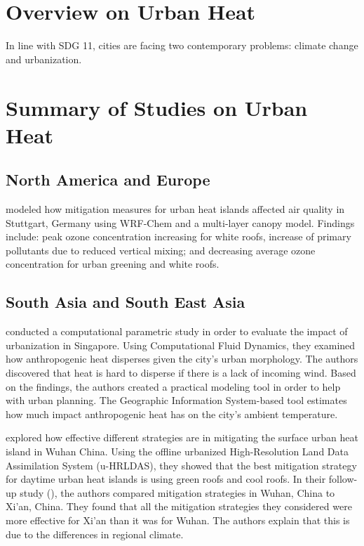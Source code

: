 \section{Overview on Urban Heat}
	
	In line with SDG 11, cities are facing two contemporary problems: climate change and urbanization.
	

\section{Summary of Studies on Urban Heat}	
	\subsection{North America and Europe}
		\textcite{Fallmann2016} modeled how mitigation measures for urban heat islands affected air quality in Stuttgart, Germany using WRF-Chem and a multi-layer canopy model. Findings include: 
			peak ozone concentration increasing for white roofs, 
			increase of primary pollutants due to reduced vertical mixing; and 
			decreasing average ozone concentration for urban greening and white roofs.
		
		
		
	\subsection{South Asia and South East Asia}
		\textcite{Yuan2020} conducted a computational parametric study in order to evaluate the impact of urbanization in Singapore.
		Using Computational Fluid Dynamics, they examined how anthropogenic heat disperses given the city's urban morphology.
		The authors discovered that heat is hard to disperse if there is a lack of incoming wind.
		Based on the findings, the authors created a practical modeling tool in order to help with urban planning. 
		The Geographic Information System-based tool estimates how much impact anthropogenic heat has on the city's ambient temperature.
		
		\textcite{Gao2019} explored how effective different strategies are in mitigating the surface urban heat island in Wuhan China.
		Using the offline urbanized High-Resolution Land Data Assimilation System (u-HRLDAS), they showed that the best mitigation strategy for daytime urban heat islands is using green roofs and cool roofs.
		In their follow-up study (\cite{Gao2020}), the authors compared mitigation strategies in Wuhan, China to Xi'an, China.
		They found that all the mitigation strategies they considered were more effective for Xi'an than it was for Wuhan. 
		The authors explain that this is due to the differences in regional climate.
		
